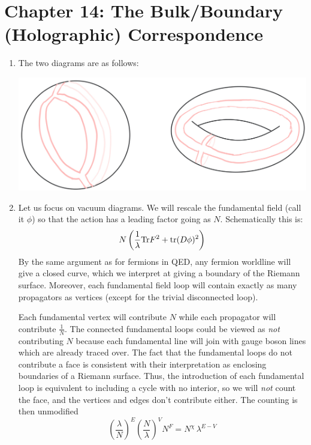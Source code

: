 \documentclass[11pt, class=article, crop=false]{standalone}
\begin{document}
\section*{Chapter 14: The Bulk/Boundary (Holographic) Correspondence} %
\label{sec:chapter_14_the_bulk_boundary_holographic_correspondence}

\begin{enumerate}
	\item The two diagrams are as follows:
	
	\begin{center}
		\includegraphics[scale=0.3]{"Drawings/Large N"}
	\end{center}
	
	\item Let us focus on vacuum diagrams. We will rescale the fundamental field (call it $\phi$) so that the action has a leading factor going as $N$. Schematically this is:
	\[
		N\left(\frac{1}{\lambda} \mathrm{Tr} F^2 + \mathrm{tr} (D \phi)^2  \right)
	\]
	 By the same argument as for fermions in QED, any fermion worldline will give a closed curve, which we interpret at giving a boundary of the Riemann surface. Moreover, each fundamental field loop will contain exactly as many propagators as vertices (except for the trivial disconnected loop). 
	
	Each fundamental vertex will contribute $N$ while each propagator will contribute $\frac{1}{N}$. The connected fundamental loops could be viewed as \emph{not} contributing $N$ because each fundamental line will join with gauge boson lines which are already traced over. The fact that the fundamental loops do not contribute a face is consistent with their interpretation as enclosing boundaries of a Riemann surface. Thus, the introduction of each fundamental loop is equivalent to including a cycle with no interior, so we will \emph{not} count the face, and the vertices and edges don't contribute either. The  counting is then unmodified
	\[
		\left(\frac{\lambda}{N} \right)^E \left(\frac{N}{\lambda} \right)^V N^F  = N^{\chi}\, \lambda^{E - V}
	\]
	

\end{enumerate}
\end{document}
